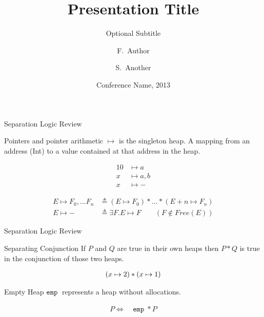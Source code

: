 \documentclass{beamer}
\title{Presentation Title}
\subtitle{Optional Subtitle}
\author{F.~Author\inst{1} \and S.~Another\inst{2}}
\institute[Universities of Somewhere and Elsewhere] %
{
  \inst{1}%
  Department of Computer Science\\
  University of Somewhere
  \and
  \inst{2}%
  Department of Theoretical Philosophy\\
  University of Elsewhere}
\date{Conference Name, 2013}
\newcommand{\mtt}[1]{
  \mathtt{#1}\;
}
\begin{document}
\setlength{\abovedisplayskip}{0pt}
\setlength{\belowdisplayskip}{0pt}
\setlength{\abovedisplayshortskip}{0pt}
\setlength{\belowdisplayshortskip}{0pt}

\begin{frame}{Separation Logic Review}
  \begin{block}{Pointers and pointer arithmetic}
    $\mapsto$ is the singleton heap. A mapping from an address (Int) to a value contained at that address in the heap.
  \end{block}

  \begin{example}
    \begin{align*}
      10 &\mapsto a \\
      x &\mapsto a,b \\
      x &\mapsto -
    \end{align*}

    \vspace{0.5cm}

    \begin{mdframed}[outerlinewidth=2]
      \begin{align*}
        E \mapsto F_0,...F_n & \triangleq (E \mapsto F_0) * ... * (E + n \mapsto F_n)\\
        E \mapsto - & \triangleq \exists F.E \mapsto F \qquad (F \notin Free(E))
      \end{align*}
    \end{mdframed}
  \end{example}
\end{frame}


\begin{frame}{Separation Logic Review}
  \begin{block}{Separating Conjunction}
    If $P$ and $Q$ are true in their own heaps then $P * Q$ is true in the conjunction of those two heaps.
  \end{block}

  \begin{example}
    \begin{align*}
      \vspace*{-1cm}
      (x \mapsto 2) * (x \mapsto 1)
    \end{align*}
  \end{example}

  \begin{block}{Empty Heap}
    $\mtt{emp}$ represents a heap without allocations.
  \end{block}

  \begin{example}
    \begin{align*}
      P \Leftrightarrow\ &\mtt{emp} * P
    \end{align*}
  \end{example}
\end{frame}
\end{document}
